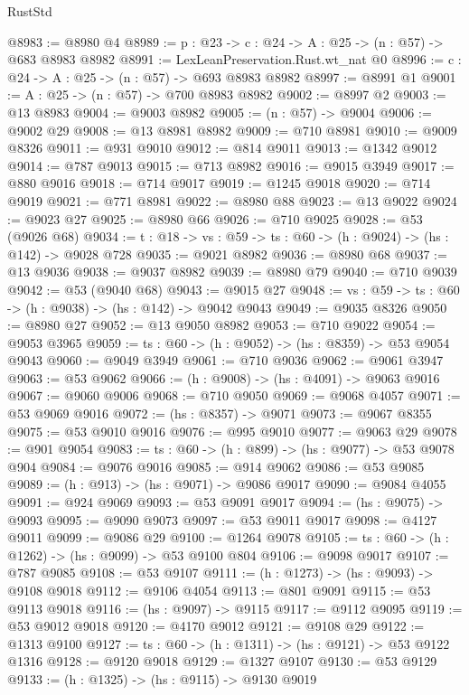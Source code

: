 \begin{lexlean}{RustStd}
\begin{coremodule}
@8983 := @8980 @4
@8989 := {p : @23} -> {c : @24} -> {A : @25} -> (n : @57) -> @683 @8983 @8982
@8991 := LexLeanPreservation.Rust.wt_nat @0
@8996 := {c : @24} -> {A : @25} -> (n : @57) -> @693 @8983 @8982
@8997 := @8991 @1
@9001 := {A : @25} -> (n : @57) -> @700 @8983 @8982
@9002 := @8997 @2
@9003 := @13 @8983
@9004 := @9003 @8982
@9005 := (n : @57) -> @9004
@9006 := @9002 @29
@9008 := @13 @8981 @8982
@9009 := @710 @8981
@9010 := @9009 @8326
@9011 := @931 @9010
@9012 := @814 @9011
@9013 := @1342 @9012
@9014 := @787 @9013
@9015 := @713 @8982
@9016 := @9015 @3949
@9017 := @880 @9016
@9018 := @714 @9017
@9019 := @1245 @9018
@9020 := @714 @9019
@9021 := @771 @8981
@9022 := @8980 @88
@9023 := @13 @9022
@9024 := @9023 @27
@9025 := @8980 @66
@9026 := @710 @9025
@9028 := @53 (@9026 @68)
@9034 := {t : @18} -> {vs : @59} -> {ts : @60} -> (h : @9024) -> (hs : @142) -> @9028 @728
@9035 := @9021 @8982
@9036 := @8980 @68
@9037 := @13 @9036
@9038 := @9037 @8982
@9039 := @8980 @79
@9040 := @710 @9039
@9042 := @53 (@9040 @68)
@9043 := @9015 @27
@9048 := {vs : @59} -> {ts : @60} -> (h : @9038) -> (hs : @142) -> @9042 @9043
@9049 := @9035 @8326
@9050 := @8980 @27
@9052 := @13 @9050 @8982
@9053 := @710 @9022
@9054 := @9053 @3965
@9059 := {ts : @60} -> (h : @9052) -> (hs : @8359) -> @53 @9054 @9043
@9060 := @9049 @3949
@9061 := @710 @9036
@9062 := @9061 @3947
@9063 := @53 @9062
@9066 := (h : @9008) -> (hs : @4091) -> @9063 @9016
@9067 := @9060 @9006
@9068 := @710 @9050
@9069 := @9068 @4057
@9071 := @53 @9069 @9016
@9072 := (hs : @8357) -> @9071
@9073 := @9067 @8355
@9075 := @53 @9010 @9016
@9076 := @995 @9010
@9077 := @9063 @29
@9078 := @901 @9054
@9083 := {ts : @60} -> (h : @899) -> (hs : @9077) -> @53 @9078 @904
@9084 := @9076 @9016
@9085 := @914 @9062
@9086 := @53 @9085
@9089 := (h : @913) -> (hs : @9071) -> @9086 @9017
@9090 := @9084 @4055
@9091 := @924 @9069
@9093 := @53 @9091 @9017
@9094 := (hs : @9075) -> @9093
@9095 := @9090 @9073
@9097 := @53 @9011 @9017
@9098 := @4127 @9011
@9099 := @9086 @29
@9100 := @1264 @9078
@9105 := {ts : @60} -> (h : @1262) -> (hs : @9099) -> @53 @9100 @804
@9106 := @9098 @9017
@9107 := @787 @9085
@9108 := @53 @9107
@9111 := (h : @1273) -> (hs : @9093) -> @9108 @9018
@9112 := @9106 @4054
@9113 := @801 @9091
@9115 := @53 @9113 @9018
@9116 := (hs : @9097) -> @9115
@9117 := @9112 @9095
@9119 := @53 @9012 @9018
@9120 := @4170 @9012
@9121 := @9108 @29
@9122 := @1313 @9100
@9127 := {ts : @60} -> (h : @1311) -> (hs : @9121) -> @53 @9122 @1316
@9128 := @9120 @9018
@9129 := @1327 @9107
@9130 := @53 @9129
@9133 := (h : @1325) -> (hs : @9115) -> @9130 @9019

\end{coremodule}
\end{lexlean}
